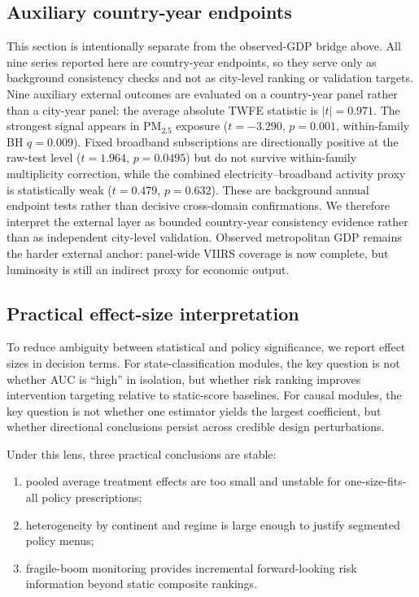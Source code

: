 \documentclass[11pt,a4paper]{article}
\begin{document}
\subsection{Auxiliary country-year endpoints}
This section is intentionally separate from the observed-GDP bridge above.
All nine series reported here are country-year endpoints, so they serve only as background consistency checks and not as city-level ranking or validation targets.
Nine auxiliary external outcomes are evaluated on a country-year panel rather than a city-year panel: the average absolute TWFE statistic is $|t|=0.971$.
The strongest signal appears in PM$_{2.5}$ exposure ($t=-3.290$, $p=0.001$, within-family BH $q=0.009$).
Fixed broadband subscriptions are directionally positive at the raw-test level ($t=1.964$, $p=0.0495$) but do not survive within-family multiplicity correction, while the combined electricity--broadband activity proxy is statistically weak ($t=0.479$, $p=0.632$).
These are background annual endpoint tests rather than decisive cross-domain confirmations.
We therefore interpret the external layer as bounded country-year consistency evidence rather than as independent city-level validation.
Observed metropolitan GDP remains the harder external anchor: panel-wide VIIRS coverage is now complete, but luminosity is still an indirect proxy for economic output.

\subsection{Practical effect-size interpretation}
To reduce ambiguity between statistical and policy significance, we report effect sizes in decision terms.
For state-classification modules, the key question is not whether AUC is ``high'' in isolation, but whether risk ranking improves intervention targeting relative to static-score baselines.
For causal modules, the key question is not whether one estimator yields the largest coefficient, but whether directional conclusions persist across credible design perturbations.

Under this lens, three practical conclusions are stable:
\begin{enumerate}[label=(\roman*)]
  \item pooled average treatment effects are too small and unstable for one-size-fits-all policy prescriptions;
  \item heterogeneity by continent and regime is large enough to justify segmented policy menus;
  \item fragile-boom monitoring provides incremental forward-looking risk information beyond static composite rankings.
\end{enumerate}
\end{document}
